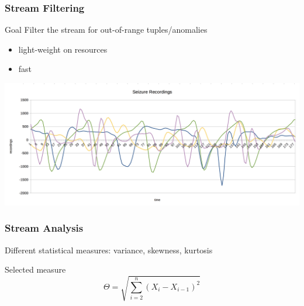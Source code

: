 \documentclass[xelatex,usenames,dvipsnames]{beamer}
\begin{document}
  \begin{frame}
    \frametitle{Stream Filtering}
    
    \alert{Goal} Filter the stream for out-of-range tuples/anomalies
    \begin{itemize}
      \item light-weight on resources
      \item fast
    \end{itemize}
    
    \includegraphics[width = \textwidth]{figs/Seizures.png}
    
  \end{frame}
  
  \begin{frame}
    \frametitle{Stream Analysis}
    
    Different statistical measures: variance, skewness, kurtosis

      
      
    \begin{exampleblock}{Selected measure}
      \begin{equation*}
        \Theta = \sqrt{\sum_{i=2}^{n}{(X_i - X_{i-1})^2}}
      \end{equation*}
    \end{exampleblock}

      
    
  \end{frame}

\end{document}
